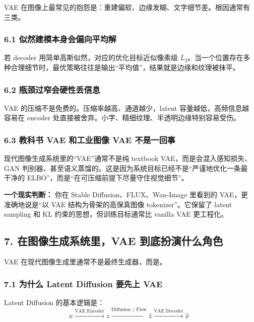 VAE 在图像上最常见的抱怨是：重建偏软、边缘发糊、文字细节差。根因通常有三类。

\subsubsection{6.1 似然建模本身会偏向平均解}

若 decoder 用简单高斯似然，对应的优化目标近似像素级 $L_2$。当一个位置存在多种合理细节时，最优策略往往是输出“平均值”，结果就是边缘和纹理被抹平。

\subsubsection{6.2 瓶颈过窄会硬性丢信息}

VAE 的压缩不是免费的。压缩率越高、通道越少，latent 容量越低，高频信息越容易在 encoder 处直接被舍弃。小字、精细纹理、半透明边缘特别容易受伤。

\subsubsection{6.3 教科书 VAE 和工业图像 VAE 不是一回事}

现代图像生成系统里的“VAE”通常不是纯 textbook VAE，而是会混入感知损失、GAN 判别器、甚至语义蒸馏的。这是因为系统目标已经不是“严谨地优化一条最干净的 ELBO”，而是“在可压缩前提下尽量守住视觉细节”。

\begin{conceptbox}
\textbf{一个现实判断：} 你在 Stable Diffusion、FLUX、Wan-Image 里看到的 VAE，更准确地说是“以 VAE 结构为骨架的高保真图像 tokenizer”。它保留了 latent sampling 和 KL 约束的思想，但训练目标通常比 vanilla VAE 更工程化。
\end{conceptbox}

\subsection{7. 在图像生成系统里，VAE 到底扮演什么角色}

VAE 在现代图像生成里通常不是最终生成器，而是。

\subsubsection{7.1 为什么 Latent Diffusion 要先上 VAE}

Latent Diffusion 的基本逻辑是：
\[
x \xrightarrow{\text{VAE Encoder}} z \xrightarrow{\text{Diffusion / Flow}} \hat{z} \xrightarrow{\text{VAE Decoder}} \hat{x}
\]

